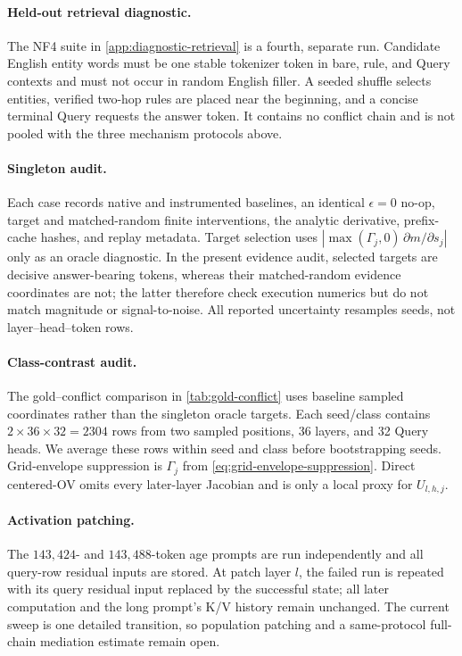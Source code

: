 \paragraph{Held-out retrieval diagnostic.}
The NF4 suite in \cref{app:diagnostic-retrieval} is a fourth, separate run.
Candidate English entity words must be one stable tokenizer token in bare,
rule, and Query contexts and must not occur in random English filler.  A seeded
shuffle selects entities, verified two-hop rules are placed near the beginning,
and a concise terminal Query requests the answer token.  It contains no conflict
chain and is not pooled with the three mechanism protocols above.

\paragraph{Singleton audit.}
Each case records native and instrumented baselines, an identical $\epsilon=0$
no-op, target and matched-random finite interventions, the analytic derivative,
prefix-cache hashes, and replay metadata.  Target selection uses
$|\max(\Gamma_j,0)\,\partial m/\partial s_j|$ only as an oracle diagnostic.  In
the present evidence audit, selected targets are decisive answer-bearing tokens,
whereas their matched-random evidence coordinates are not; the latter therefore
check execution numerics but do not match magnitude or signal-to-noise.  All
reported uncertainty resamples seeds, not layer--head--token rows.

\paragraph{Class-contrast audit.}
The gold--conflict comparison in \cref{tab:gold-conflict} uses baseline sampled
coordinates rather than the singleton oracle targets.  Each seed/class contains
$2\times36\times32=2304$ rows from two sampled positions, 36 layers, and 32
Query heads.  We average these rows within seed and class before bootstrapping seeds.
Grid-envelope suppression is $\Gamma_j$ from
\cref{eq:grid-envelope-suppression}.  Direct centered-OV omits every later-layer
Jacobian and is only a local proxy for $U_{l,h,j}$.

\paragraph{Activation patching.}
The $143{,}424$- and $143{,}488$-token age prompts are run independently and all
query-row residual inputs are stored.  At patch layer $l$, the failed run is
repeated with its query residual input replaced by the successful state; all
later computation and the long prompt's K/V history remain unchanged.  The
current sweep is one detailed transition, so population patching and a
same-protocol full-chain mediation estimate remain open.

